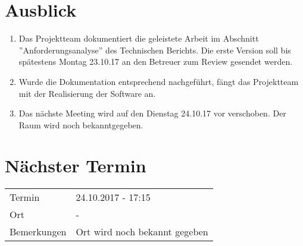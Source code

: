 \documentclass[11pt, a4paper,oneside]{scrartcl}
\begin{document}
\section{Ausblick}
\begin{enumerate}
	\item Das Projektteam dokumentiert die geleistete Arbeit im Abschnitt ''Anforderungsanalyse'' des Technischen Berichts. Die erste Version soll bis spätestens Montag 23.10.17 an den Betreuer zum Review gesendet werden.
	\item Wurde die Dokumentation entsprechend nachgeführt, fängt das Projektteam mit der Realisierung der Software an.
	\item Das nächste Meeting wird auf den Dienstag 24.10.17 vor verschoben. Der Raum wird noch bekanntgegeben.
\end{enumerate}

\section{Nächster Termin}
\begin{tabu} to \linewidth {l X }
	\toprule
	Termin & 24.10.2017 - 17:15 \\
	Ort & - \\
	Bemerkungen & Ort wird noch bekannt gegeben \\
	\bottomrule
\end{tabu}
\end{document}
